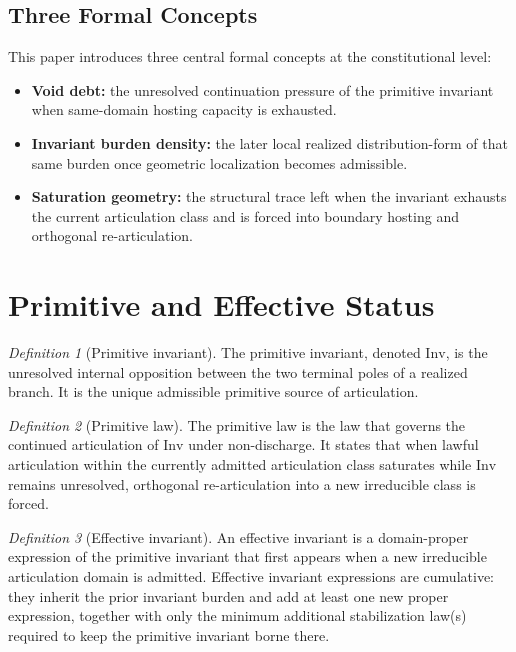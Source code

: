 \documentclass[11pt]{article}
\theoremstyle{definition}
\theoremstyle{plain}
\theoremstyle{remark}
\newtheorem{definition}{Definition}
\newcommand{\Inv}{\mathrm{Inv}}
\begin{document}
\subsection*{Three Formal Concepts}

This paper introduces three central formal concepts at the constitutional
level:

\begin{itemize}[leftmargin=2.2em]
    \item \textbf{Void debt:} the unresolved continuation pressure of the
    primitive invariant when same-domain hosting capacity is exhausted.

    \item \textbf{Invariant burden density:} the later local realized
    distribution-form of that same burden once geometric localization becomes
    admissible.

    \item \textbf{Saturation geometry:} the structural trace left when the
    invariant exhausts the current articulation class and is forced into
    boundary hosting and orthogonal re-articulation.
\end{itemize}

\section{Primitive and Effective Status}

\begin{definition}[Primitive invariant]
The primitive invariant, denoted $\Inv$, is the unresolved internal opposition between the two terminal poles of a realized branch. It is the unique admissible primitive source of articulation.
\end{definition}

\begin{definition}[Primitive law]
The primitive law is the law that governs the continued articulation of $\Inv$ under non-discharge. It states that when lawful articulation within the currently admitted articulation class saturates while $\Inv$ remains unresolved, orthogonal re-articulation into a new irreducible class is forced.
\end{definition}

\begin{definition}[Effective invariant]
An effective invariant is a domain-proper expression of the primitive invariant that first appears when a new irreducible articulation domain is admitted. Effective invariant expressions are cumulative: they inherit the prior invariant burden and add at least one new proper expression, together with only the minimum additional stabilization law(s) required to keep the primitive invariant borne there.
\end{definition}
\end{document}
